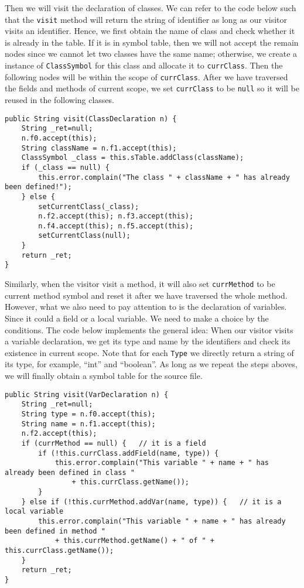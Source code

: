 \documentclass[letterpaper, 14pt]{article}
\begin{document}
Then we will visit the declaration of classes. We can refer to the code below such that the \texttt{visit} method will return the string of identifier as long as our visitor visits an identifier. Hence, we first obtain the name of class and check whether it is already in the table. If it is in symbol table, then we will not accept the remain 
nodes since we cannot let two classes have the same name; otherwise, we create a instance of \texttt{ClassSymbol} for this class and allocate it to \texttt{currClass}. Then the following nodes will be within the scope of \texttt{currClass}. After we have traversed the fields and methods of current scope, we set \texttt{currClass} to be \texttt{null} so it will be reused in the following classes. 
\begin{lstlisting}
public String visit(ClassDeclaration n) {
	String _ret=null;
	n.f0.accept(this);
	String className = n.f1.accept(this);
	ClassSymbol _class = this.sTable.addClass(className);
	if (_class == null) {
		this.error.complain("The class " + className + " has already been defined!");
	} else {
		setCurrentClass(_class);
		n.f2.accept(this); n.f3.accept(this);
		n.f4.accept(this); n.f5.accept(this);
		setCurrentClass(null);
	}
	return _ret;
}
\end{lstlisting}

Similarly, when the visitor visit a method, it will also set \texttt{currMethod} to be current method symbol and reset it after we have traversed the whole method. However, what we also need to pay attention to is the declaration of variables. Since it could a field or a local variable. We need to make a choice by the conditions. The code below implements the general idea: When our visitor visits a variable declaration, we get its type and name by the identifiers and check its existence in current scope. Note that for each \texttt{Type} we directly return a string of its type, for example, ``int'' and ``boolean''. As long as we repeat the steps aboves, we will finally obtain a symbol table for the source file. 
\begin{lstlisting}
public String visit(VarDeclaration n) {
	String _ret=null;
	String type = n.f0.accept(this);
	String name = n.f1.accept(this);
	n.f2.accept(this);
	if (currMethod == null) {	// it is a field
		if (!this.currClass.addField(name, type)) {
			this.error.complain("This variable " + name + " has already been defined in class " 
				+ this.currClass.getName());
		}
	} else if (!this.currMethod.addVar(name, type)) {	// it is a local variable
		this.error.complain("This variable " + name + " has already been defined in method " 
			+ this.currMethod.getName() + " of " + this.currClass.getName());
	}
	return _ret;
}
\end{lstlisting}
\end{document}
